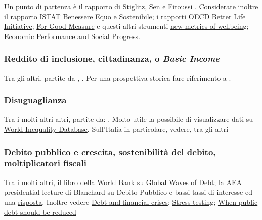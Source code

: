 \documentclass[12pt]{article}
\begin{document}
Un punto di partenza \`e il rapporto di Stiglitz, Sen e Fitoussi
\citep{stiglitz_etal_beyond-gdp}. Considerate inoltre il rapporto ISTAT \href{https://www.istat.it/it/archivio/rapporto+bes}{Benessere Equo e Sostenibile}; i rapporti OECD
\href{http://www.oecd.org/statistics/better-life-initiative.htm}{Better
  Life Initiative};
\href{http://www.oecd.org/social/for-good-measure-9789264307278-en.htm}{For
  Good Measure} e questi altri strumenti
\href{https://www.project-syndicate.org/commentary/new-metrics-of-wellbeing-not-just-gdp-by-joseph-e-stiglitz-2018-12}{new
  metrics of wellbeing}; \href{https://www8.gsb.columbia.edu/faculty/jstiglitz/sites/jstiglitz/files/The%20Measurement%20of%20Economic%20Performance%20and%20Social%20Progress.pdf}{Economic Performance and Social Progress}.

  
\subsubsection*{Reddito di inclusione, cittadinanza, o \textit{Basic Income}}

Tra gli altri, partite da \cite{toso_2016},
\cite{vanparijs_2017_basic-income}. Per una prospettiva storica fare
riferimento a \cite{orsi_2018}.


\subsubsection*{Disuguaglianza}

Tra i molti altri altri, partite da: \cite{atkinson_2010_top,
  piketty_2014_capital, piketty_2015_inequality, atkinson_2015,
  milanovic_2011_worlds, milanovic_2016_global}. Molto utile la
possibile di visualizzare dati su \href{https://wid.world/}{World
  Inequality Database}. Sull'Italia in particolare, vedere, tra gli
altri \cite{pianta_franzini_2016, pianta_2012_nove}



\subsubsection*{Debito pubblico e crescita, sostenibilit\`a del debito, moltiplicatori fiscali}

Tra i molti altri, il libro della World Bank su
\href{https://www.worldbank.org/en/research/publication/waves-of-debt}{Global
  Waves of Debt}; la AEA presidential lecture di Blanchard su Debito
Pubblico e bassi tassi di interesse \citep{blanchard_2019} ed una
\href{https://voxeu.org/content/olivier-wonderland}{risposta}. Inoltre vedere
\href{https://voxeu.org/article/debt-and-financial-crises-will-history-repeat-itself}{Debt
  and financial crises};
\href{https://voxeu.org/article/stress-testing-eu-fiscal-framework}{Stress
  testing}; \href{
  https://www.imf.org/external/pubs/ft/sdn/2015/sdn1510.pdf}{When
  public debt should be reduced}
\end{document}
